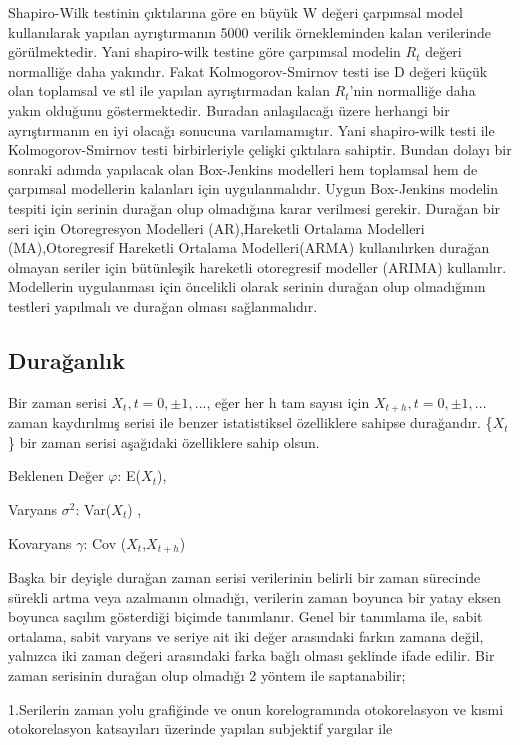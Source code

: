 \documentclass[11pt]{article}
\begin{document}
    
    Shapiro-Wilk testinin çıktılarına göre en büyük W değeri çarpımsal model
kullanılarak yapılan ayrıştırmanın 5000 verilik örnekleminden kalan
verilerinde görülmektedir. Yani shapiro-wilk testine göre çarpımsal
modelin \(R_t\) değeri normalliğe daha yakındır. Fakat
Kolmogorov-Smirnov testi ise D değeri küçük olan toplamsal ve stl ile
yapılan ayrıştırmadan kalan \(R_t\)'nin normalliğe daha yakın olduğunu
göstermektedir. Buradan anlaşılacağı üzere herhangi bir ayrıştırmanın en
iyi olacağı sonucuna varılamamıştır. Yani shapiro-wilk testi ile
Kolmogorov-Smirnov testi birbirleriyle çelişki çıktılara sahiptir.
Bundan dolayı bir sonraki adımda yapılacak olan Box-Jenkins modelleri
hem toplamsal hem de çarpımsal modellerin kalanları için uygulanmalıdır.
Uygun Box-Jenkins modelin tespiti için serinin durağan olup olmadığına
karar verilmesi gerekir. Durağan bir seri için Otoregresyon Modelleri
(AR),Hareketli Ortalama Modelleri (MA),Otoregresif Hareketli Ortalama
Modelleri(ARMA) kullanılırken durağan olmayan seriler için bütünleşik
hareketli otoregresif modeller (ARIMA) kullanılır. Modellerin
uygulanması için öncelikli olarak serinin durağan olup olmadığının
testleri yapılmalı ve durağan olması sağlanmalıdır.

\subsection{Durağanlık}\label{duraux11fanlux131k}

Bir zaman serisi \({X_t, t=0, ± 1, ...}\), eğer her h tam sayısı için
\({X_{t+h}, t=0, ± 1, ...}\) zaman kaydırılmış serisi ile benzer
istatistiksel özelliklere sahipse durağandır. \{\(X_t\)\} bir zaman
serisi aşağıdaki özelliklere sahip olsun.

Beklenen Değer \(\varphi\): E(\(X_t\)),

Varyans \(\sigma^2\): Var(\(X_t\)) ,

Kovaryans \(\gamma\): Cov (\(X_t\),\(X_{t+h}\))

Başka bir deyişle durağan zaman serisi verilerinin belirli bir zaman
sürecinde sürekli artma veya azalmanın olmadığı, verilerin zaman boyunca
bir yatay eksen boyunca saçılım gösterdiği biçimde tanımlanır. Genel bir
tanımlama ile, sabit ortalama, sabit varyans ve seriye ait iki değer
arasındaki farkın zamana değil, yalnızca iki zaman değeri arasındaki
farka bağlı olması şeklinde ifade edilir. Bir zaman serisinin durağan
olup olmadığı 2 yöntem ile saptanabilir;

1.Serilerin zaman yolu grafiğinde ve onun korelogramında otokorelasyon
ve kısmi otokorelasyon katsayıları üzerinde yapılan subjektif yargılar
ile
\end{document}
